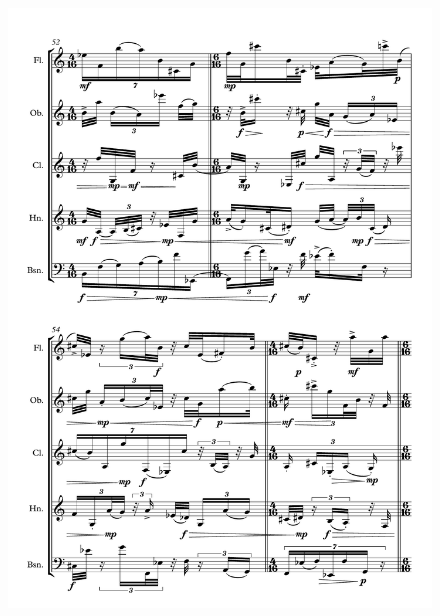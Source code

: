 \begin{figure}[H]
    \centering
	\includegraphics[width=6.5in]{figures/Out_of_Focus_11.pdf}
\end{figure}

